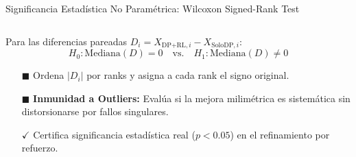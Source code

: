 \begin{frame}{Significancia Estadística No Paramétrica: Wilcoxon Signed-Rank Test}
\begin{columns}[T, onlytextwidth]
    \begin{column}{0.485\textwidth}
      \begin{tcolorbox}[
        enhanced,
        colback=WhiteBg,
        colframe=UCNBlue,
        arc=\CardArc,
        boxrule=\CardRule,
        height=\CardHeightDouble,
        title={\CardTitleFont Wilcoxon Signed-Rank Test},
        colbacktitle=UCNBlue,
        coltitle=WhiteBg,
        top=1.2mm, bottom=1.2mm, left=1.8mm, right=1.8mm
      ]
        {\BodyFont
        Para las diferencias pareadas $D_i = X_{\text{DP+RL}, i} - X_{\text{SoloDP}, i}$:
        \begin{equation*}
          H_0: \text{Mediana}(D) = 0 \quad \text{vs.} \quad H_1: \text{Mediana}(D) \neq 0
        \end{equation*}
        \vspace{0.5mm}
        \begin{itemize}\setlength{\itemsep}{1.5pt}
          \item[\textcolor{UCNBlue}{$\blacksquare$}] Ordena $|D_i|$ por ranks y asigna a cada rank el signo original.
          \item[\textcolor{UCNBlue}{$\blacksquare$}] \textbf{Inmunidad a Outliers:} Evalúa si la mejora milimétrica es sistemática sin distorsionarse por fallos singulares.
          \item[\textcolor{AgriGreen}{\textbf{$\checkmark$}}] Certifica significancia estadística real ($p < 0.05$) en el refinamiento por refuerzo.
        \end{itemize}}
      \end{tcolorbox}
    \end{column}
  \end{columns}
\end{frame}

